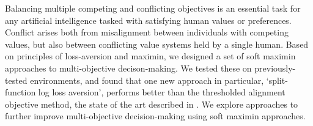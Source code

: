 
Balancing multiple competing and conflicting objectives is an essential task for any artificial intelligence tasked with satisfying human values or preferences. Conflict arises both from misalignment between individuals with competing values, but also between conflicting value systems held by a single human. Based on principles of loss-aversion and maximin, we designed a set of soft maximin approaches to multi-objective decison-making. We tested these on previously-tested environments, and found that one new approach in particular, `split-function log loss aversion', performs better than the thresholded alignment objective method, the state of the art described in \cite{vamplew_potential-based_2021}. We explore approaches to further improve multi-objective decision-making using soft maximin approaches.